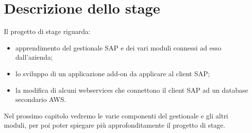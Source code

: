 \section{Descrizione dello stage}
Il progetto di stage riguarda:
\begin{itemize}
	\item apprendimento del gestionale SAP e dei vari moduli connessi ad esso dall'azienda;
	\item lo sviluppo di un applicazione add-on da applicare al client SAP;
	\item la modifica di alcuni webservices che connettono il client SAP ad un database secondario AWS.
\end{itemize}
Nel prossimo capitolo vedremo le varie componenti del gestionale e gli altri moduli, per poi poter spiegare più approfonditamente il progetto di stage.